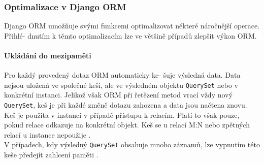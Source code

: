 \documentclass[ing,male,java,dept456]{diploma}						%
\begin{document}
\subsubsection{Optimalizace v Django ORM}
\label{subsubsec:DjangoOpt}

Django ORM umožňuje svými funkcemi optimalizovat některé náročnější operace. Přihlé- dnutím k těmto optimalizacím lze ve většině případů zlepšit výkon ORM. 

\paragraph{Ukládání do mezipaměti}

Pro každý provedený dotaz ORM automaticky ke- šuje výsledná data. Data nejsou uložená ve společné keši, ale ve výsledném objektu \lstinline[style=inlinepython]|QuerySet| nebo v konkrétní instanci. Jelikož však ORM při řetězení metod vrací vždy nový \lstinline[style=inlinepython]|QuerySet|, keš je při každé změně dotazu zahozena a data jsou načtena znovu. \\
Keš je použita v instanci v případě přístupu k relacím. Platí to však pouze, pokud relace odkazuje na konkrétní objekt. Keš se u relací M:N nebo zpětných relací u instance nepoužije \cite{dj-queries}. \\
V případech, kdy výsledný \lstinline[style=inlinepython]|QuerySet| obsahuje mnoho záznamů, lze vypnutím této keše předejít zahlcení paměti \cite{dj-querysets}. %
\end{document}
